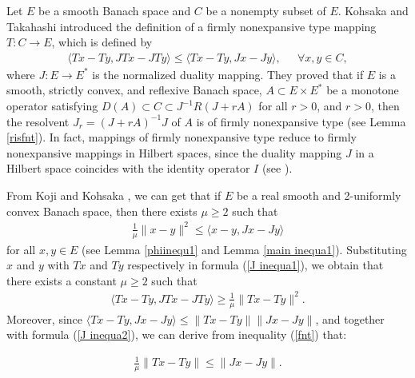\documentclass[12pt,a4paper]{amsart}
\theoremstyle{definition}
\numberwithin{equation}{section}
\begin{document}
Let \( E \) be a smooth Banach space and \(C\) be a nonempty subset of $E$. Kohsaka and Takahashi \cite{KT} introduced the definition of a firmly nonexpansive type mapping \( T: C \to E \), which is defined by
\begin{align}\label{fnt}
  \langle Tx - Ty, JTx - JTy \rangle \leq \langle Tx - Ty, Jx - Jy \rangle,~~\quad \forall x,y\in C,
\end{align}
where \(J: E \to E^{*}\) is the normalized duality mapping. They \cite{KT} proved that if \( E \) is a smooth, strictly convex, and reflexive Banach space, \( A \subset E \times E^* \) be a monotone operator satisfying $D(A) \subset C \subset J^{-1}R(J + rA)$ for all \( r > 0 \), and \( r > 0 \), then the resolvent \( J_{r} = (J + rA)^{-1}J \) of \( A \) is of firmly nonexpansive type (see Lemma \ref{risfnt}). In fact, mappings of firmly nonexpansive type reduce to firmly nonexpansive mappings in Hilbert spaces, since the duality mapping $J$ in a Hilbert space coincides with the identity operator $I$ (see \cite{BC}).

From Koji and Kohsaka \cite{AK}, we can get that if \( E \) be a real smooth and 2-uniformly convex Banach space, then there exists \( \mu \geq 2 \) such that
\begin{align}\label{J inequa1}
  \frac{1}{\mu}\| x - y\| ^{2} \leq \langle x - y, Jx - Jy \rangle
\end{align}
for all \( x, y \in E \) (see Lemma \ref{phiinequ1} and Lemma \ref{main inequa1}). Substituting \(x\) and \(y\) with \(Tx\) and \(Ty\) respectively in formula (\ref{J inequa1}), we obtain that there exists a constant \( \mu \geq 2 \) such that
\begin{align}\label{J inequa2}
  \langle Tx - Ty, JTx - JTy \rangle \geq \frac{1}{\mu} \|Tx - Ty\|^2.
\end{align}
Moreover, since \( \langle Tx - Ty, Jx - Jy \rangle \leq \|Tx - Ty\| \|Jx - Jy\| \),  and together with formula (\ref{J inequa2}), we can derive from inequality (\ref{fnt}) that:

\begin{align}\label{JT inequ}
  \frac{1}{\mu}\|Tx - Ty\| \leq \|Jx - Jy\|.
\end{align}
\end{document}
